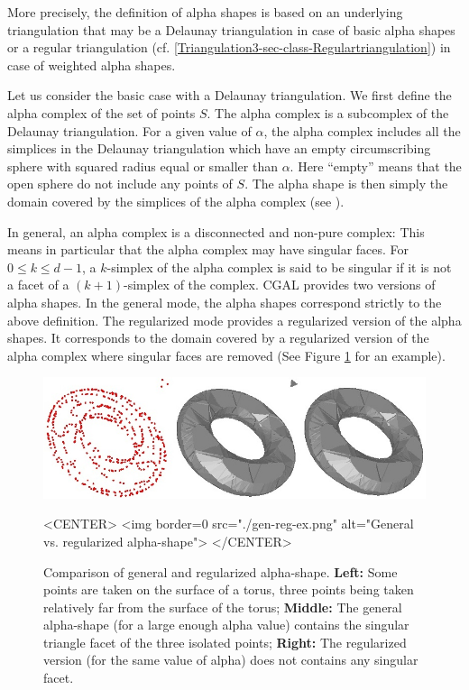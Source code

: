 More precisely, the definition of alpha shapes is based on an underlying
triangulation that may be a Delaunay triangulation 
in case of basic alpha shapes 
or a regular triangulation 
(cf. \ref{Triangulation3-sec-class-Regulartriangulation})
in case of weighted alpha shapes.

Let us consider the basic case with a Delaunay triangulation.
We first define the alpha complex  of the set of points $S$. 
The  alpha complex is a subcomplex 
of the Delaunay triangulation.
For a given value of $\alpha$, the alpha complex includes
all the simplices in the Delaunay triangulation which have
an empty  circumscribing sphere with squared radius equal or smaller than $\alpha$.
Here ``empty'' means  that the open sphere 
do not include  any points of $S$.
The alpha shape is then simply the domain covered by the simplices
of the alpha complex (see \cite{em-tdas-94}).

In general, an alpha complex is a disconnected and non-pure complex:
This means in particular that the alpha complex may have
singular faces.  For $0 \leq k \leq d-1$,
a $k$-simplex of the alpha complex  is said to be
singular if it is not a facet of a $(k+1)$-simplex of the complex.
CGAL provides two versions of alpha shapes. In the general mode,
the alpha shapes correspond strictly to the above definition.
The regularized mode provides a regularized version of the alpha shapes.
It corresponds to the domain covered by a regularized version
of the alpha complex where singular faces are removed 
(See Figure \ref{fig-gen-reg-ex} for an example).


\begin{figure}
\begin{ccTexOnly}
\begin{center}
\includegraphics[width=15cm]{Alpha_shapes_3/gen-reg-ex.png}
\end{center}
\end{ccTexOnly}
\begin{ccHtmlOnly}
<CENTER>
<img border=0 src="./gen-reg-ex.png" alt="General vs. regularized alpha-shape">
</CENTER>
\end{ccHtmlOnly}

\caption{Comparison of general and regularized alpha-shape.
\textbf{Left:} Some points are taken on the surface of a torus, 
three points being taken relatively
far from the surface of the torus;
\textbf{Middle:} The general alpha-shape (for a large enough alpha value)
contains the singular triangle facet of the three isolated points;
\textbf{Right:} The regularized version (for the same value of alpha) does not contains any singular facet.
\label{fig-gen-reg-ex}}
\end{figure}






